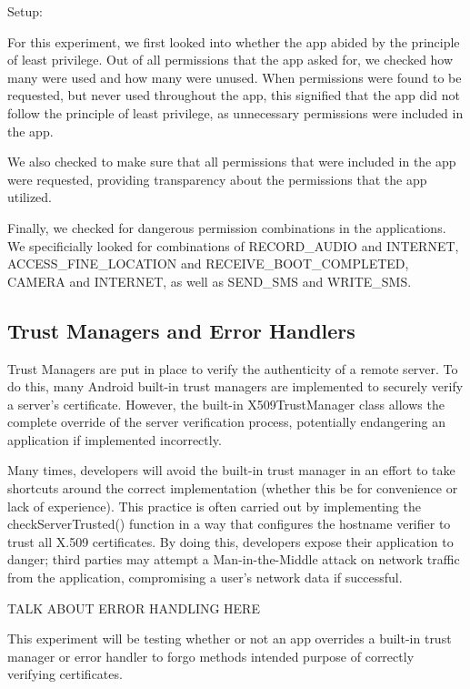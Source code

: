         Setup: 
        
        For this experiment, we first looked into whether the app abided by the 
        principle  of least privilege. Out of all permissions that the app asked 
        for, we checked how many were used and how many were unused. When permissions 
        were found to be requested, but never used throughout the app, this signified
        that the app did not follow the principle of least privilege, as unnecessary 
        permissions were included in the app. 

        We also checked to make sure that all permissions that were included in the app
        were requested, providing transparency about the permissions that the app 
        utilized. 

        Finally, we checked for dangerous permission combinations in the 
        applications. We specificially looked for combinations of RECORD\_AUDIO and 
        INTERNET, ACCESS\_FINE\_LOCATION and RECEIVE\_BOOT\_COMPLETED, CAMERA and 
        INTERNET, as well as SEND\_SMS and WRITE\_SMS. 

    \subsection{Trust Managers and Error Handlers}

        Trust Managers are put in place to verify the authenticity of a 
        remote server. To do this, many Android built-in trust managers 
        are implemented to securely verify a server's certificate.
        However, the built-in X509TrustManager class allows the complete 
        override of the server verification process, potentially endangering
        an application if implemented incorrectly.

        Many times, developers will avoid the built-in trust manager in an
        effort to take shortcuts around the correct implementation (whether
        this be for convenience or lack of experience). This practice is often
        carried out by implementing the checkServerTrusted() function in a way 
        that configures the hostname verifier to trust all X.509 certificates. 
        By doing this, developers expose their application to danger; 
        third parties may attempt a Man-in-the-Middle attack on network traffic
        from the application, compromising a user's network data if successful.

        TALK ABOUT ERROR HANDLING HERE

        This experiment will be testing whether or not an app overrides a built-in
        trust manager or error handler to forgo methods intended purpose of
        correctly verifying certificates.

